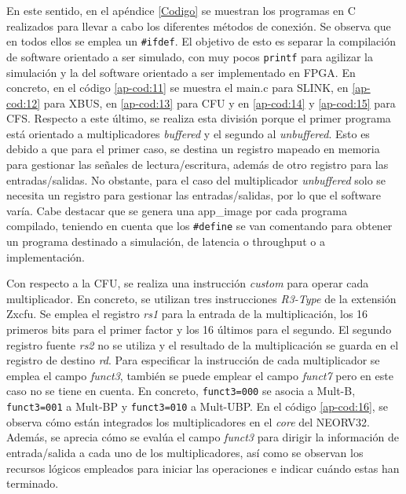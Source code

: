 En este sentido, en el apéndice \ref{Codigo} se muestran los programas en C realizados para llevar a cabo los diferentes métodos de conexión.
Se observa que en todos ellos se emplea un \texttt{#ifdef}.
El objetivo de esto es separar la compilación de software orientado a ser simulado, con muy pocos \texttt{printf} para agilizar la simulación y la del software orientado a ser implementado en FPGA.
En concreto, en el código \ref{ap-cod:11} se muestra el main.c para SLINK, en \ref{ap-cod:12} para XBUS, en \ref{ap-cod:13} para CFU y en \ref{ap-cod:14} y \ref{ap-cod:15} para CFS.
Respecto a este último, se realiza esta división porque el primer programa está orientado a multiplicadores \textit{buffered} y el segundo al \textit{unbuffered}.
Esto es debido a que para el primer caso, se destina un registro mapeado en memoria para gestionar las señales de lectura/escritura, además de otro registro para las entradas/salidas. No obstante, para el caso del multiplicador \textit{unbuffered} solo se necesita un registro para gestionar las entradas/salidas, por lo que el software varía.
Cabe destacar que se genera una app\_image por cada programa compilado, teniendo en cuenta que los \texttt{#define} se van comentando para obtener un programa destinado a simulación, de latencia o throughput o a implementación.

Con respecto a la CFU, se realiza una instrucción \textit{custom} para operar cada multiplicador.
En concreto, se utilizan tres instrucciones \textit{R3-Type} de la extensión Zxcfu.
Se emplea el registro \textit{rs1} para la entrada de la multiplicación, los 16 primeros bits para el primer factor y los 16 últimos para el segundo.
El segundo registro fuente \textit{rs2} no se utiliza y el resultado de la multiplicación se guarda en el registro de destino \textit{rd}.
Para especificar la instrucción de cada multiplicador se emplea el campo \textit{funct3}, también se puede emplear el campo \textit{funct7} pero en este caso no se tiene en cuenta.
En concreto, \texttt{funct3=000} se asocia a Mult-B, \texttt{funct3=001} a Mult-BP y \texttt{funct3=010} a Mult-UBP.
En el código \ref{ap-cod:16}, se observa cómo están integrados los multiplicadores en el \textit{core} del NEORV32.
Además, se aprecia cómo se evalúa el campo \textit{funct3} para dirigir la información de entrada/salida a cada uno de los multiplicadores, así como se observan los recursos lógicos empleados para iniciar las operaciones e indicar cuándo estas han terminado.


